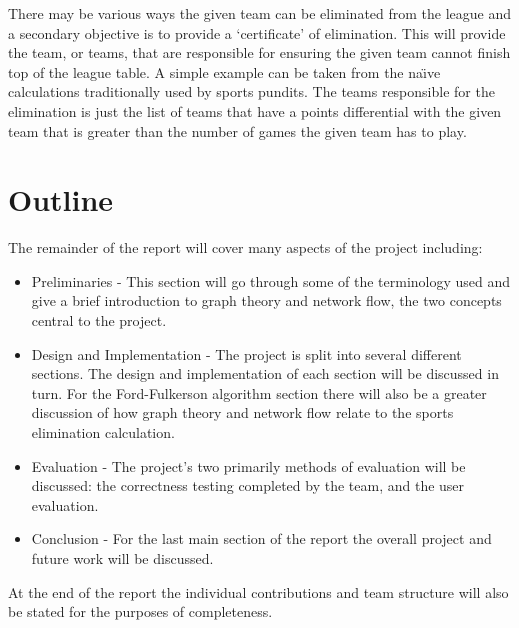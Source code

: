 There may be various ways the given team can be eliminated from the league
and a secondary objective is to provide a `certificate' of elimination. This
will provide the team, or teams, that are responsible for ensuring the given
team cannot finish top of the league table. A simple example can be taken
from the na\"{\i}ve calculations traditionally used by sports pundits. The
teams responsible for the elimination is just the list of teams that have a
points differential with the given team that is greater than the number of 
games the given team has to play.

\section{Outline}

The remainder of the report will cover many aspects of the project including:

\begin{itemize}
\item Preliminaries - This section will go through some of the terminology used
and give a brief introduction to graph theory and network flow, the two
concepts central to the project.
\item Design and Implementation - The project is split into several different
sections. The design and implementation of each section will be discussed in
turn. For the Ford-Fulkerson algorithm section there will also be a greater
discussion of how graph theory and network flow relate to the sports
elimination calculation.
\item Evaluation - The project's two primarily methods of evaluation will be
discussed: the correctness testing completed by the team, and the user
evaluation.
\item Conclusion - For the last main section of the report the overall
project and future work will be discussed.
\end{itemize}

At the end of the report the individual contributions and team structure will
also be stated for the purposes of completeness.